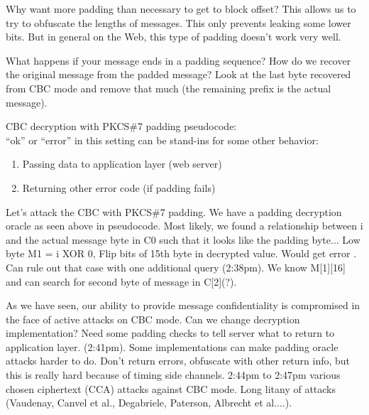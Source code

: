 Why want more padding than necessary to get to block offset? This allows us to try to obfuscate the lengths of messages. This only prevents leaking some lower bits. But in general on the Web, this type of padding doesn't work very well.

What happens if your message ends in a padding sequence? How do we recover the original message from the padded message? Look at the last byte recovered from CBC mode and remove that much (the remaining prefix is the actual message).

CBC decryption with PKCS\#7 padding pseudocode:
\vspace{0.2cm}\\
``ok'' or ``error'' in this setting can be stand-ins for some other behavior:
\begin{enumerate}
    \item Passing data to application layer (web server)
    \item Returning other error code (if padding fails)
\end{enumerate}


Let's attack the CBC with PKCS\#7 padding. We have a padding decryption oracle as seen above in pseudocode. Most likely, we found a relationship between i and the actual message byte in C0 such that it looks like the padding byte...
Low byte M1 = i XOR 0, %
Flip bits of 15th byte in decrypted value. Would get error . Can rule out that case with one additional query (2:38pm).
We know M[1][16] and can search for second byte of message in C[2](?).

As we have seen, our ability to provide message confidentiality is compromised in the face of active attacks on CBC mode. Can we change decryption implementation? Need some padding checks to tell server what to return to application layer. (2:41pm). Some implementations can make padding oracle attacks harder to do. Don't return errors, obfuscate with other return info, but this is really hard because of timing side channels.
2:44pm to 2:47pm various chosen ciphertext (CCA) attacks against CBC mode. Long litany of attacks (Vaudenay, Canvel et al., Degabriele,
Paterson, Albrecht et al....).

